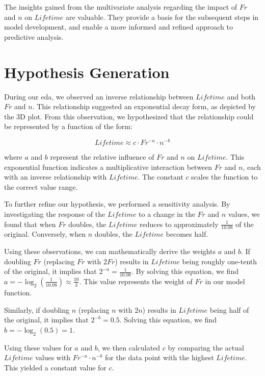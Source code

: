 The insights gained from the multivariate analysis regarding the impact of \(Fr\) and \(n\) on \(Lifetime\) are valuable. They provide a basis for the subsequent steps in model development, and enable a more informed and refined approach to predictive analysis.


\section{Hypothesis Generation}

During our \ac{eda}, we observed an inverse relationship between \(Lifetime\) and both \(Fr\) and \(n\). This relationship suggested an exponential decay form, as depicted by the 3D plot. From this observation, we hypothesized that the relationship could be represented by a function of the form:

\begin{equation}
\label{eq:hypothesis}
Lifetime \approx c \cdot Fr^{-a} \cdot n^{-b}
\end{equation}

where \(a\) and \(b\) represent the relative influence of \(Fr\) and \(n\) on \(Lifetime\). This exponential function indicates a multiplicative interaction between \(Fr\) and \(n\), each with an inverse relationship with \(Lifetime\). The constant \(c\) scales the function to the correct value range.

To further refine our hypothesis, we performed a sensitivity analysis. By investigating the response of the \(Lifetime\) to a change in the \(Fr\) and \(n\) values, we found that when \(Fr\) doubles, the \(Lifetime\) reduces to approximately \(\frac{1}{10.08}\) of the original. Conversely, when \(n\) doubles, the \(Lifetime\) becomes half. 

Using these observations, we can mathematically derive the weights \(a\) and \(b\). If doubling \(Fr\) (replacing \(Fr\) with \(2Fr\)) results in \(Lifetime\) being roughly one-tenth of the original, it implies that \(2^{-a} = \frac{1}{10.08}\). By solving this equation, we find \(a = -\log_2(\frac{1}{10.08}) \approx \frac{10}{3}\). This value represents the weight of \(Fr\) in our model function.

Similarly, if doubling \(n\) (replacing \(n\) with \(2n\)) results in \(Lifetime\) being half of the original, it implies that \(2^{-b} = 0.5\). Solving this equation, we find \(b = -\log_2(0.5) = 1\).

Using these values for \(a\) and \(b\), we then calculated \(c\) by comparing the actual \(Lifetime\) values with \(Fr^{-a} \cdot n^{-b}\) for the data point with the highest \(Lifetime\). This yielded a constant value for \(c\).

